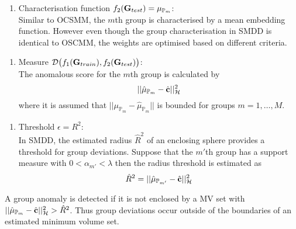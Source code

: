 %
 \begin{enumerate}[2.]
\item Characterisation function $f_2({\bf G}_{test})=\mu_{\mathbb{P}_m}$: \\ 
Similar to OCSMM, the $m$th group is characterised by  a mean embedding function. However even though the group characterisation in SMDD is identical to OSCMM, the weights are optimised based on different criteria. \end{enumerate}
\begin{enumerate}[3.]
\item Measure $ \mathcal{D}\big( f_1({\bf G}_{train}), f_2({\bf G}_{test})\big )$: \\
The anomalous score for the $m$th group is calculated by \[ || \hat{\mu}_{\mathbb{P}_m} -  \hat{\bf c} ||^2_\mathcal{H}  \]
where it is assumed that  $||  \mu_{\mathbb{P}_m}  - \hat{\mu}_{ {\mathbb{P}}_m } || $ is bounded  for   groups $m=1,\dots,M$. 
\end{enumerate}
%
\begin{enumerate}[4.]
\item Threshold $\epsilon={R}^2$: \\ In SMDD, the estimated radius 
$\hat{R}^2$   of an enclosing sphere provides a threshold for group deviations.  Suppose that the $m'$th group has a support measure with $ 0 <\alpha_{m'} < \displaystyle \lambda$ then the radius threshold is estimated as
\[ \hat{R}^2  =  || \hat{\mu}_{\mathbb{P}_ {m'} } -  \hat{\bf c} ||_\mathcal{H}^2  \]
\end{enumerate}
A group anomaly is detected if it is not enclosed by a MV set with
$ || \hat{\mu}_{\mathbb{P}_{m} } -  \hat{\bf c} ||^2_\mathcal{H} > \hat{R}^2$. Thus  group deviations occur  outside of the boundaries of an estimated minimum volume set. 

